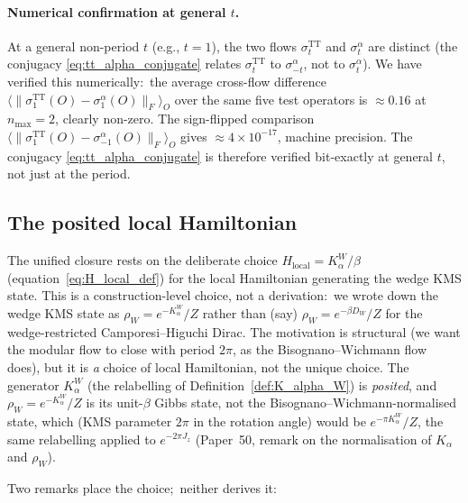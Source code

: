 \documentclass[11pt,a4paper]{article}
\theoremstyle{plain}
\theoremstyle{definition}
\newcommand{\nmax}{n_{\max}}
\newcommand{\Frob}[1]{\lVert #1 \rVert_{F}}
\newcommand{\TT}{\mathrm{TT}}
\begin{document}
\paragraph{Numerical confirmation at general $t$.}
At a general non-period $t$ (e.g., $t = 1$), the two flows
$\sigma_t^{\TT}$ and $\sigma_t^{\alpha}$ are distinct (the conjugacy
\eqref{eq:tt_alpha_conjugate} relates $\sigma_t^{\TT}$ to
$\sigma_{-t}^{\alpha}$, not to $\sigma_t^{\alpha}$). We have verified
this numerically:\ the average cross-flow difference
$\langle \Frob{\sigma_1^{\TT}(O) - \sigma_1^{\alpha}(O)} \rangle_O$
over the same five test operators is $\approx 0.16$ at $\nmax = 2$,
clearly non-zero. The sign-flipped comparison
$\langle \Frob{\sigma_1^{\TT}(O) - \sigma_{-1}^{\alpha}(O)} \rangle_O$
gives $\approx 4 \times 10^{-17}$, machine precision. The conjugacy
\eqref{eq:tt_alpha_conjugate} is therefore verified bit-exactly at
general $t$, not just at the period.

\subsection{The posited local Hamiltonian}
\label{sec:derived_hamiltonian}

The unified closure rests on the deliberate choice
$H_{\mathrm{local}} = K_\alpha^W / \beta$
(equation~\eqref{eq:H_local_def}) for the local Hamiltonian
generating the wedge KMS state. This is a construction-level choice,
not a derivation:\ we wrote down the wedge KMS state as $\rho_W =
e^{-K_\alpha^W}/Z$ rather than (say) $\rho_W = e^{-\beta D_W}/Z$ for
the wedge-restricted Camporesi--Higuchi Dirac. The motivation is
structural (we want the modular flow to close with period $2\pi$, as
the Bisognano--Wichmann flow does), but it is \emph{a} choice of local
Hamiltonian, not the unique choice.  The generator $K_\alpha^W$ (the
relabelling of Definition~\ref{def:K_alpha_W}) is \emph{posited}, and $\rho_W = e^{-K_\alpha^W}/Z$ is its unit-$\beta$
Gibbs state, not the Bisognano--Wichmann-normalised state, which (KMS
parameter $2\pi$ in the rotation angle) would be
$e^{-\pi K_\alpha^W}/Z$, the same relabelling applied to
$e^{-2\pi J_z}$ (Paper~50, remark on the
normalisation of $K_\alpha$ and $\rho_W$).

Two remarks place the choice;\ neither derives it:
\end{document}
